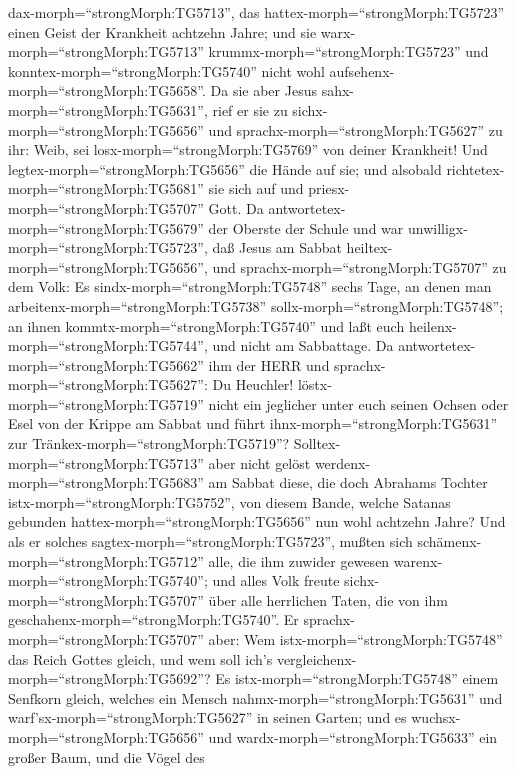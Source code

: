dax-morph=``strongMorph:TG5713'', das
hattex-morph=``strongMorph:TG5723'' einen Geist der Krankheit achtzehn
Jahre; und sie warx-morph=``strongMorph:TG5713''
krummx-morph=``strongMorph:TG5723'' und
konntex-morph=``strongMorph:TG5740'' nicht wohl
aufsehenx-morph=``strongMorph:TG5658''.  Da sie aber Jesus
sahx-morph=``strongMorph:TG5631'', rief er sie zu
sichx-morph=``strongMorph:TG5656'' und
sprachx-morph=``strongMorph:TG5627'' zu ihr: Weib, sei
losx-morph=``strongMorph:TG5769'' von deiner Krankheit! 
Und legtex-morph=``strongMorph:TG5656'' die Hände auf sie; und alsobald
richtetex-morph=``strongMorph:TG5681'' sie sich auf und
priesx-morph=``strongMorph:TG5707'' Gott.  Da
antwortetex-morph=``strongMorph:TG5679'' der Oberste der Schule und war
unwilligx-morph=``strongMorph:TG5723'', daß Jesus am Sabbat
heiltex-morph=``strongMorph:TG5656'', und
sprachx-morph=``strongMorph:TG5707'' zu dem Volk: Es
sindx-morph=``strongMorph:TG5748'' sechs Tage, an denen man
arbeitenx-morph=``strongMorph:TG5738''
sollx-morph=``strongMorph:TG5748''; an ihnen
kommtx-morph=``strongMorph:TG5740'' und laßt euch
heilenx-morph=``strongMorph:TG5744'', und nicht am Sabbattage.
 Da antwortetex-morph=``strongMorph:TG5662'' ihm der HERR
und sprachx-morph=``strongMorph:TG5627'': Du Heuchler!
löstx-morph=``strongMorph:TG5719'' nicht ein jeglicher unter euch seinen
Ochsen oder Esel von der Krippe am Sabbat und führt
ihnx-morph=``strongMorph:TG5631'' zur
Tränkex-morph=``strongMorph:TG5719''? 
Solltex-morph=``strongMorph:TG5713'' aber nicht gelöst
werdenx-morph=``strongMorph:TG5683'' am Sabbat diese, die doch Abrahams
Tochter istx-morph=``strongMorph:TG5752'', von diesem Bande, welche
Satanas gebunden hattex-morph=``strongMorph:TG5656'' nun wohl achtzehn
Jahre?  Und als er solches
sagtex-morph=``strongMorph:TG5723'', mußten sich
schämenx-morph=``strongMorph:TG5712'' alle, die ihm zuwider gewesen
warenx-morph=``strongMorph:TG5740''; und alles Volk freute
sichx-morph=``strongMorph:TG5707'' über alle herrlichen Taten, die von
ihm geschahenx-morph=``strongMorph:TG5740''.  Er
sprachx-morph=``strongMorph:TG5707'' aber: Wem
istx-morph=``strongMorph:TG5748'' das Reich Gottes gleich, und wem soll
ich's vergleichenx-morph=``strongMorph:TG5692''?  Es
istx-morph=``strongMorph:TG5748'' einem Senfkorn gleich, welches ein
Mensch nahmx-morph=``strongMorph:TG5631'' und
warf'sx-morph=``strongMorph:TG5627'' in seinen Garten; und es
wuchsx-morph=``strongMorph:TG5656'' und
wardx-morph=``strongMorph:TG5633'' ein großer Baum, und die Vögel des
